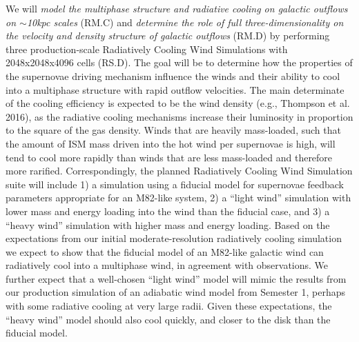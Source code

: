 \documentclass[11pt,letterpaper,english]{article}
\begin{document}
We will \textit{model the multiphase structure and radiative cooling on galactic outflows on $\sim$10kpc scales} (RM.C)
and \textit{determine the role of full three-dimensionality on the velocity and density structure of galactic outflows} (RM.D)
by performing three production-scale Radiatively Cooling Wind Simulations with 2048x2048x4096 cells (RS.D). The goal will be to 
determine how the properties of the supernovae driving mechanism influence the winds and their ability to cool
into a multiphase structure with rapid outflow velocities. The main determinate of the cooling efficiency is
expected to be the wind density (e.g., Thompson et al. 2016), as the radiative cooling mechanisms increase their
luminosity in proportion to the square of the gas density. Winds that are heavily mass-loaded, such that the
amount of ISM mass driven into the hot wind per supernovae is high, will tend to cool more rapidly than winds
that are less mass-loaded and therefore more rarified. Correspondingly, the planned Radiatively Cooling Wind Simulation
suite will include 1) a simulation using a 
fiducial model for supernovae feedback parameters appropriate for an M82-like system, 2) a ``light
wind'' simulation with lower mass and energy loading into the wind than the fiducial case, and 3) a ``heavy wind''
simulation with higher mass and energy loading. Based on the expectations from our initial moderate-resolution
radiatively cooling simulation we expect to show that the fiducial model of an M82-like galactic wind can
radiatively cool into a multiphase wind, in agreement with observations. We further expect that a well-chosen
``light wind'' model will mimic the results from our production simulation of an
adiabatic wind model from Semester 1, perhaps with some radiative cooling at very large radii. Given these
expectations, the ``heavy wind'' model should also cool quickly, and closer to the disk than the fiducial model.
~\\
~\\
\end{document}
